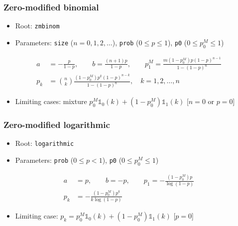 \documentclass[x11names]{article}
\newcommand{\code}[1]{\texttt{#1}}
\begin{document}
\subsubsection{Zero-modified binomial}

\begin{itemize}
\item Root: \code{zmbinom}
\item Parameters: \code{size} ($n = 0, 1, 2, \dots$),
  \code{prob} ($0 \leq p \leq 1$),
  \code{p0} ($0 \leq p_0^M \leq 1$)
\end{itemize}
\begin{align*}
  a &= -\frac{p}{1 - p}, \qquad b = \frac{(n + 1)p}{1 - p}, \qquad
      p_1^M = \frac{m (1 - p_0^M) p (1 - p)^{n - 1}}{1 - (1 - p)^n} \\
  p_k &= \binom{n}{k} \frac{(1 - p_0^M) p^k (1 - p)^{n - k}}{1 - (1 - p)^n}, \quad
        k = 1, 2, \dots, n
\end{align*}

\begin{itemize}
\item Limiting cases: mixture
  $p_0^M \mathbb{1}_0(k) + (1 - p_0^M) \mathbb{1}_1(k)$ [$n = 0$ or $p = 0$]
\end{itemize}

\subsubsection{Zero-modified logarithmic}

\begin{itemize}
\item Root: \code{logarithmic}
\item Parameters: \code{prob} ($0 \leq p < 1$),
  \code{p0} ($0 \leq p_0^M \leq 1$)
\end{itemize}
\begin{align*}
  a &= p, \qquad b = -p, \qquad
      p_1 = - \frac{(1 - p_0^M) p}{\log (1 - p)} \\
  p_k &= - \frac{(1 - p_0^M) p^k}{k \log (1 - p)}
\end{align*}

\begin{itemize}
\item Limiting case:
  $p_k = p_0^M \mathbb{1}_0(k) + (1 - p_0^M) \mathbb{1}_1(k)$ [$p = 0$]
\end{itemize}



\end{document}
